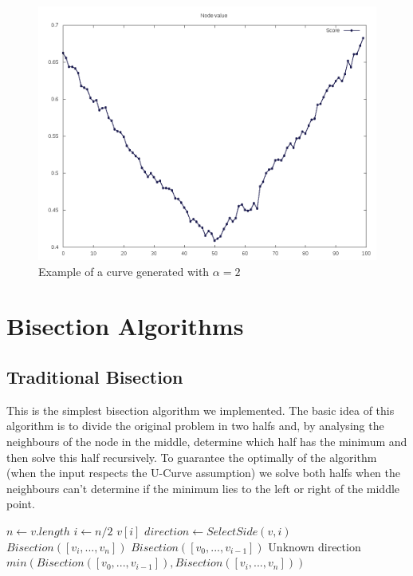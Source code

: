 \documentclass[12pt]{article}
\begin{document}
\begin{figure}[H]
\caption{Example of a curve generated with $\alpha = 2$}
\centering
\includegraphics[scale=.5]{alpha_two_curve}
\end{figure}

\newpage
\section{Bisection Algorithms}
\subsection{Traditional Bisection}
This is the simplest bisection algorithm we implemented. The basic idea of this algorithm is to divide the original problem in two halfs and, by analysing the neighbours of the node in the middle, determine which half has the minimum and then solve this half recursively. To guarantee the optimally of the algorithm (when the input respects the U-Curve assumption) we solve both halfs when the neighbours can't determine if the minimum lies to the left or right of the middle point.
\begin{algorithm}[h]
\caption{}
\begin{algorithmic}[1]
    \State $n \gets v.length$
    \State $i \gets n / 2$
        \State
        \Return $v[i]$
    \Else
        \State $direction \gets SelectSide (v, i)$
            \State
            \Return $Bisection ([v_i, ..., v_n])$
            \State
            \Return $Bisection ([v_0, ..., v_{i - 1}])$
        \Else \Comment Unknown direction
            \State
            \Return $min (Bisection ([v_0, ..., v_{i - 1}]), Bisection ([v_i, ..., v_n]))$
        \EndIf
    \EndIf

\EndProcedure
\end{algorithmic}
\end{algorithm}
\end{document}
